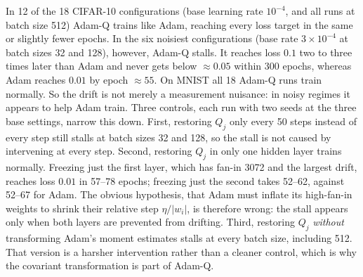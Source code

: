\documentclass[10pt]{article}
\theoremstyle{remark}
\begin{document}
In 12 of the 18 CIFAR-10 configurations (base learning rate $10^{-4}$, and all runs at batch size 512) Adam-Q trains like Adam, reaching every loss target in the same or slightly fewer epochs. In the six noisiest configurations (base rate $3\times10^{-4}$ at batch sizes 32 and 128), however, Adam-Q stalls. It reaches loss $0.1$ two to three times later than Adam and never gets below $\approx0.05$ within 300 epochs, whereas Adam reaches $0.01$ by epoch $\approx55$. On MNIST all 18 Adam-Q runs train normally. So the drift is not merely a measurement nuisance: in noisy regimes it appears to help Adam train. Three controls, each run with two seeds at the three base settings, narrow this down. First, restoring $Q_j$ only every 50 steps instead of every step still stalls at batch sizes 32 and 128, so the stall is not caused by intervening at every step. Second, restoring $Q_j$ in only one hidden layer trains normally. Freezing just the first layer, which has fan-in 3072 and the largest drift, reaches loss $0.01$ in 57--78 epochs; freezing just the second takes 52--62, against 52--67 for Adam. The obvious hypothesis, that Adam must inflate its high-fan-in weights to shrink their relative step $\eta/|w_i|$, is therefore wrong: the stall appears only when both layers are prevented from drifting. Third, restoring $Q_j$ \emph{without} transforming Adam's moment estimates stalls at every batch size, including 512. That version is a harsher intervention rather than a cleaner control, which is why the covariant transformation is part of Adam-Q.
\end{document}
